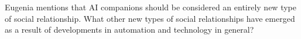 Eugenia mentions that AI companions should be considered an entirely new type of social relationship.
What other new types of social relationships have emerged as a result of developments in automation and technology in general?